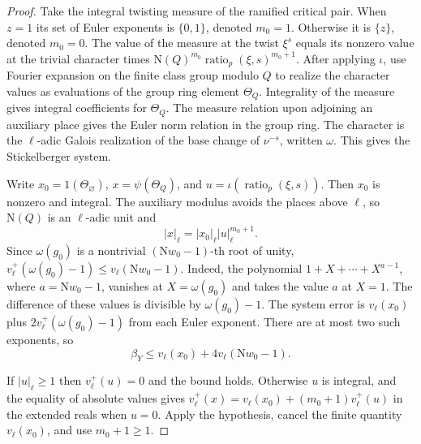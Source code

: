 \begin{proof}
Take the integral twisting measure of the ramified critical pair. When $z=1$ its set of Euler exponents is $\{0,1\}$, denoted $m_0=1$. Otherwise it is $\{z\}$, denoted $m_0=0$. The value of the measure at the twist $\xi^s$ equals its nonzero value at the trivial character times $\mathrm N(Q)^{m_0}\operatorname{ratio}_p(\xi,s)^{m_0+1}$.
After applying $\iota$, use Fourier expansion on the finite class group modulo $Q$ to realize the character values as evaluations of the group ring element $\Theta_Q$. Integrality of the measure gives integral coefficients for $\Theta_Q$. The measure relation upon adjoining an auxiliary place gives the Euler norm relation in the group ring. The character is the $\ell$-adic Galois realization of the base change of $\nu^{-s}$, written $\omega$. This gives the Stickelberger system.

Write $x_0=1(\Theta_\varnothing)$, $x=\psi(\Theta_Q)$, and $u=\iota(\operatorname{ratio}_p(\xi,s))$. Then $x_0$ is nonzero and integral. The auxiliary modulus avoids the places above $\ell$, so $\mathrm N(Q)$ is an $\ell$-adic unit and
\[
 |x|_\ell=|x_0|_\ell |u|_\ell^{m_0+1}.
\]
Since $\omega(g_0)$ is a nontrivial $(\mathrm Nw_0-1)$-th root of unity, $v_\ell^+(\omega(g_0)-1)\le v_\ell(\mathrm Nw_0-1)$. Indeed, the polynomial $1+X+\cdots+X^{a-1}$, where $a=\mathrm Nw_0-1$, vanishes at $X=\omega(g_0)$ and takes the value $a$ at $X=1$. The difference of these values is divisible by $\omega(g_0)-1$. The system error is $v_\ell(x_0)$ plus $2v_\ell^+(\omega(g_0)-1)$ from each Euler exponent. There are at most two such exponents, so
\[
 \beta_Y\le v_\ell(x_0)+4v_\ell(\mathrm Nw_0-1).
\]

If $|u|_\ell\ge1$ then $v_\ell^+(u)=0$ and the bound holds. Otherwise $u$ is integral, and the equality of absolute values gives $v_\ell^+(x)=v_\ell(x_0)+(m_0+1)v_\ell^+(u)$ in the extended reals when $u=0$. Apply the hypothesis, cancel the finite quantity $v_\ell(x_0)$, and use $m_0+1\ge1$.
\end{proof}

